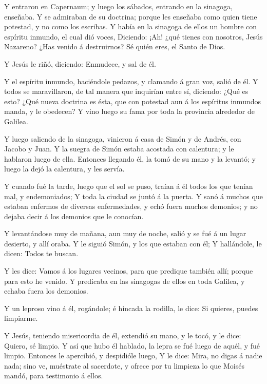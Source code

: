  Y entraron en Capernaum; y luego los sábados, entrando en
la sinagoga, enseñaba.  Y se admiraban de su doctrina;
porque les enseñaba como quien tiene potestad, y no como los escribas.
 Y había en la sinagoga de ellos un hombre con espíritu
inmundo, el cual dió voces,  Diciendo: ¡Ah! ¿qué tienes con
nosotros, Jesús Nazareno? ¿Has venido á destruirnos? Sé quién eres, el
Santo de Dios.

 Y Jesús le riñó, diciendo: Enmudece, y sal de él.

 Y el espíritu inmundo, haciéndole pedazos, y clamando á
gran voz, salió de él.  Y todos se maravillaron, de tal
manera que inquirían entre sí, diciendo: ¿Qué es esto? ¿Qué nueva
doctrina es ésta, que con potestad aun á los espíritus inmundos manda, y
le obedecen?  Y vino luego su fama por toda la provincia
alrededor de Galilea.

 Y luego saliendo de la sinagoga, vinieron á casa de Simón
y de Andrés, con Jacobo y Juan.  Y la suegra de Simón
estaba acostada con calentura; y le hablaron luego de ella.
 Entonces llegando él, la tomó de su mano y la levantó; y
luego la dejó la calentura, y les servía.

 Y cuando fué la tarde, luego que el sol se puso, traían á
él todos los que tenían mal, y endemoniados;  Y toda la
ciudad se juntó á la puerta.  Y sanó á muchos que estaban
enfermos de diversas enfermedades, y echó fuera muchos demonios; y no
dejaba decir á los demonios que le conocían.

 Y levantándose muy de mañana, aun muy de noche, salió y se
fué á un lugar desierto, y allí oraba.  Y le siguió Simón,
y los que estaban con él;  Y hallándole, le dicen: Todos te
buscan.

 Y les dice: Vamos á los lugares vecinos, para que predique
también allí; porque para esto he venido.  Y predicaba en
las sinagogas de ellos en toda Galilea, y echaba fuera los demonios.

 Y un leproso vino á él, rogándole; é hincada la rodilla,
le dice: Si quieres, puedes limpiarme.

 Y Jesús, teniendo misericordia de él, extendió su mano, y
le tocó, y le dice: Quiero, sé limpio.  Y así que hubo él
hablado, la lepra se fué luego de aquél, y fué limpio. 
Entonces le apercibió, y despidióle luego,  Y le dice:
Mira, no digas á nadie nada; sino ve, muéstrate al sacerdote, y ofrece
por tu limpieza lo que Moisés mandó, para testimonio á ellos.

